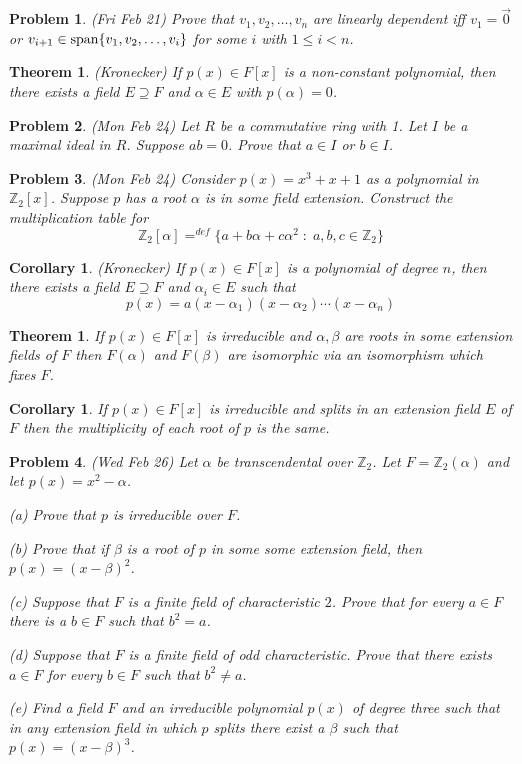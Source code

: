 \documentclass[12pt]{article}
\def\span{{\rm span}}
\def\al{\alpha}
\def\be{\beta}
\def\zz{{\mathbb Z}}
\def\al{\alpha}
\def\be{\beta}
\def\span{{ \rm span }}
\def\st{\;:\;}
\newtheorem{thm}[theorem]{Theorem}
\newtheorem{cor}[theorem]{Corollary}
\newtheorem{prob}{Problem}
\begin{document}
\begin{prob}
(Fri Feb 21) Prove that $v_1,v_2,\ldots,v_n$ are linearly dependent
iff $v_1=\vec{0}$ or $v_{i+1}\in\span\{v_1,v_2,\ldots,v_i\}$
for some $i$ with $1\leq i<n$.
\end{prob}


\begin{thm}
(Kronecker) If $p(x)\in F[x]$ is a non-constant polynomial, then
there exists a field $E\supseteq F$ and $\al\in E$ with
$p(\al)=0$.
\end{thm}

\begin{prob}
(Mon Feb 24) Let $R$ be a commutative ring with 1.  Let $I$ be
a maximal ideal in $R$.  Suppose $ab=0$. Prove that $a\in I$ or 
$b\in I$.
\end{prob}

\begin{prob}
(Mon Feb 24) Consider $p(x)=x^3+x+1$ as a polynomial in $\zz_2[x]$.
Suppose $p$ has a root $\al$ is in some field extension.  Construct
the multiplication table for 
$$\zz_2[\al]=^{def}\{a+b\al+c\al^2 \st a,b,c\in \zz_2\}$$
\end{prob}


\begin{cor}(Kronecker)
If $p(x)\in F[x]$ is a polynomial of degree $n$, then
there exists a field $E\supseteq F$ and $\al_i\in E$ such that
$$p(x)=a(x-\al_1)(x-\al_2)\cdots (x-\al_n)$$
\end{cor}

\begin{thm}
If $p(x)\in F[x]$ is irreducible and $\al,\be$ are roots in
some extension fields of $F$ then $F(\al)$ and $F(\be)$ are
isomorphic via an isomorphism which fixes $F$.
\end{thm}

\begin{cor}
If  $p(x)\in F[x]$ is irreducible and splits in an extension field $E$
of $F$ then the multiplicity of each root of $p$ is the same. 
\end{cor}


\begin{prob}
(Wed Feb 26) Let $\al$ be transcendental over $\zz_2$.  Let
$F=\zz_2(\al)$ and let $p(x)=x^2-\al$.  
\par (a) Prove that $p$ is irreducible over $F$.
\par (b) Prove that if $\be$ is a root of $p$ in some
some extension field, then $p(x)=(x-\be)^2$.
\par (c) Suppose that $F$ is a finite field of characteristic $2$.
Prove that for every $a\in F$ there is a $b\in F$ such that $b^2=a$.
\par (d)  Suppose that $F$ is a finite field of odd characteristic.
Prove that there exists $a\in F$ for every $b\in F$ such that $b^2\neq a$.
\par (e) Find a field $F$ and an irreducible polynomial $p(x)$ of
degree three such that in any extension field in which $p$ splits
there exist a $\be$ such that $p(x)=(x-\be)^3$.
\end{prob}
\end{document}
